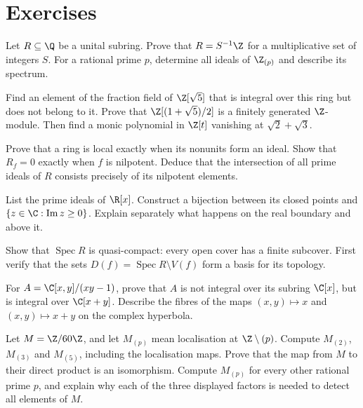 \section{Exercises}

\begin{exercise}[$\star$]\label{ex:subringsq}
Let $R\subseteq\Q$ be a unital subring. Prove that $R=S^{-1}\Z$ for a multiplicative set of integers $S$. For a rational prime $p$, determine all ideals of $\Z_{(p)}$ and describe its spectrum.
\end{exercise}

\begin{exercise}[$\star$]\label{ex:golden}
Find an element of the fraction field of $\Z[\sqrt5]$ that is integral over this ring but does not belong to it. Prove that $\Z[(1+\sqrt5)/2]$ is a finitely generated $\Z$-module. Then find a monic polynomial in $\Z[t]$ vanishing at $\sqrt2+\sqrt3$.
\end{exercise}

\begin{exercise}[$\star\star$]\label{ex:localiff}
Prove that a ring is local exactly when its nonunits form an ideal. Show that $R_f=0$ exactly when $f$ is nilpotent. Deduce that the intersection of all prime ideals of $R$ consists precisely of its nilpotent elements.
\end{exercise}

\begin{exercise}[$\star\star$]\label{ex:specrx}
List the prime ideals of $\R[x]$. Construct a bijection between its closed points and $\{z\in\C:\operatorname{Im}z\ge0\}$. Explain separately what happens on the real boundary and above it.
\end{exercise}

\begin{exercise}[$\star\star$]\label{ex:quasicompact}
Show that $\operatorname{Spec}R$ is quasi-compact: every open cover has a finite subcover. First verify that the sets $D(f)=\operatorname{Spec}R\setminus V(f)$ form a basis for its topology.
\end{exercise}

\begin{exercise}[$\star\star$]\label{ex:hyperbola}
For $A=\C[x,y]/(xy-1)$, prove that $A$ is not integral over its subring $\C[x]$, but is integral over $\C[x+y]$. Describe the fibres of the maps $(x,y)\mapsto x$ and $(x,y)\mapsto x+y$ on the complex hyperbola.
\end{exercise}

\begin{exercise}[$\star\star$]\label{ex:v10new-ch05-torsion}
Let $M=\Z/60\Z$, and let $M_{(p)}$ mean localisation at $\Z\setminus(p)$. Compute $M_{(2)}$, $M_{(3)}$ and $M_{(5)}$, including the localisation maps. Prove that the map from $M$ to their direct product is an isomorphism. Compute $M_{(p)}$ for every other rational prime $p$, and explain why each of the three displayed factors is needed to detect all elements of $M$.
\end{exercise}

